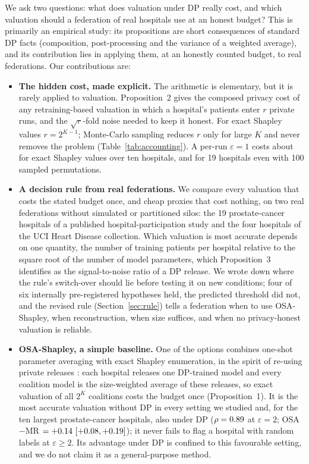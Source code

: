 \documentclass[journal]{IEEEtran}
\begin{document}
We ask two questions: what does valuation under DP really cost, and which valuation should a federation of real hospitals use at an honest budget? This is primarily an empirical study: its propositions are short consequences of standard DP facts (composition, post-processing and the variance of a weighted average), and its contribution lies in applying them, at an honestly counted budget, to real federations. Our contributions are:
\begin{itemize}
    \item \textbf{The hidden cost, made explicit.} The arithmetic is elementary, but it is rarely applied to valuation. Proposition~2 gives the composed privacy cost of any retraining-based valuation in which a hospital's patients enter $r$ private runs, and the $\sqrt r$-fold noise needed to keep it honest. For exact Shapley values $r=2^{K-1}$; Monte-Carlo sampling reduces $r$ only for large $K$ and never removes the problem (Table~\ref{tab:accounting}). A per-run $\varepsilon=1$ costs about \trueEpsOne{} for exact Shapley values over ten hospitals, and \accMcNineteenOne{} for 19 hospitals even with 100 sampled permutations.
    \item \textbf{A decision rule from real federations.} We compare every valuation that costs the stated budget once, and cheap proxies that cost nothing, on two real federations without simulated or partitioned silos: the 19 prostate-cancer hospitals of a published hospital-participation study and the four hospitals of the UCI Heart Disease collection. Which valuation is most accurate depends on one quantity, the number of training patients per hospital relative to the square root of the number of model parameters, which Proposition~3 identifies as the signal-to-noise ratio of a DP release. We wrote down where the rule's switch-over should lie before testing it on new conditions; four of six internally pre-registered hypotheses held, the predicted threshold did not, and the revised rule (Section~\ref{sec:rule}) tells a federation when to use OSA-Shapley, when reconstruction, when size suffices, and when no privacy-honest valuation is reliable.
    \item \textbf{OSA-Shapley, a simple baseline.} One of the options combines one-shot parameter averaging \cite{Zhang2013AVGM} with exact Shapley enumeration, in the spirit of re-using private releases \cite{Zhou2025Data}: each hospital releases one DP-trained model and every coalition model is the size-weighted average of these releases, so exact valuation of all $2^K$ coalitions costs the budget once (Proposition~1). It is the most accurate valuation without DP in every setting we studied and, for the ten largest prostate-cancer hospitals, also under DP ($\rho=0.89$ at $\varepsilon=2$; OSA$-$MR $=+0.14\ [+0.08, +0.19]$); it never fails to flag a hospital with random labels at $\varepsilon\ge2$. Its advantage under DP is confined to this favourable setting, and we do not claim it as a general-purpose method.

\end{itemize}
\end{document}
